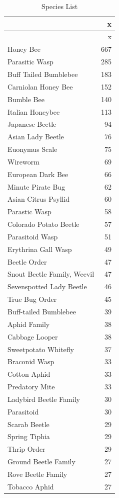 \documentclass[
  12pt,
]{article}
\begin{document}
\begin{longtable}[]{@{}lr@{}}
\caption{Species List}\tabularnewline
\toprule
& x \\
\midrule
\endfirsthead
\toprule
& x \\
\midrule
\endhead
Honey Bee & 667 \\
Parasitic Wasp & 285 \\
Buff Tailed Bumblebee & 183 \\
Carniolan Honey Bee & 152 \\
Bumble Bee & 140 \\
Italian Honeybee & 113 \\
Japanese Beetle & 94 \\
Asian Lady Beetle & 76 \\
Euonymus Scale & 75 \\
Wireworm & 69 \\
European Dark Bee & 66 \\
Minute Pirate Bug & 62 \\
Asian Citrus Psyllid & 60 \\
Parastic Wasp & 58 \\
Colorado Potato Beetle & 57 \\
Parasitoid Wasp & 51 \\
Erythrina Gall Wasp & 49 \\
Beetle Order & 47 \\
Snout Beetle Family, Weevil & 47 \\
Sevenspotted Lady Beetle & 46 \\
True Bug Order & 45 \\
Buff-tailed Bumblebee & 39 \\
Aphid Family & 38 \\
Cabbage Looper & 38 \\
Sweetpotato Whitefly & 37 \\
Braconid Wasp & 33 \\
Cotton Aphid & 33 \\
Predatory Mite & 33 \\
Ladybird Beetle Family & 30 \\
Parasitoid & 30 \\
Scarab Beetle & 29 \\
Spring Tiphia & 29 \\
Thrip Order & 29 \\
Ground Beetle Family & 27 \\
Rove Beetle Family & 27 \\
Tobacco Aphid & 27 \\

\end{longtable}
\end{document}
